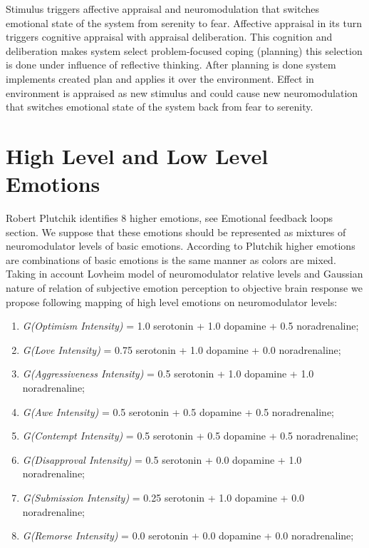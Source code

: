 Stimulus triggers affective appraisal and neuromodulation that switches emotional state of the system from serenity to fear. Affective appraisal in its turn triggers cognitive appraisal with appraisal deliberation. This cognition and deliberation makes system select problem-focused coping (planning) this selection is done under influence of reflective thinking. After planning is done system implements created plan and applies it over the environment. Effect in environment is appraised as new stimulus and could cause new neuromodulation that switches emotional state of the system back from fear to serenity.

\section{High Level and Low Level Emotions}

Robert Plutchik \cite{natureofemotions} identifies 8 higher emotions, see Emotional feedback loops section. We suppose that these emotions should be represented as mixtures of neuromodulator levels of basic emotions. According to Plutchik higher emotions are combinations of basic emotions is the same manner as colors are mixed. Taking in account Lovheim model of neuromodulator relative levels and Gaussian nature of relation of subjective emotion perception to objective brain response \cite{senticcomputing, neuralcorrelatesofhate} we propose following mapping of high level emotions on neuromodulator levels:

\begin{enumerate}
 \item  \emph{G(Optimism Intensity)} = 1.0 serotonin  + 1.0 dopamine + 0.5 noradrenaline;
 \item  \emph{G(Love Intensity)} = 0.75 serotonin + 1.0 dopamine + 0.0 noradrenaline;
 \item  \emph{G(Aggressiveness Intensity)} = 0.5 serotonin + 1.0 dopamine + 1.0 noradrenaline;
 \item  \emph{G(Awe Intensity)} = 0.5 serotonin + 0.5 dopamine + 0.5 noradrenaline;
 \item  \emph{G(Contempt Intensity)} = 0.5 serotonin + 0.5 dopamine + 0.5 noradrenaline;
 \item  \emph{G(Disapproval Intensity)} = 0.5 serotonin + 0.0 dopamine + 1.0 noradrenaline;
 \item  \emph{G(Submission Intensity)} = 0.25 serotonin + 1.0 dopamine + 0.0 noradrenaline;
 \item  \emph{G(Remorse Intensity)} = 0.0 serotonin + 0.0 dopamine + 0.0 noradrenaline;
\end{enumerate}

